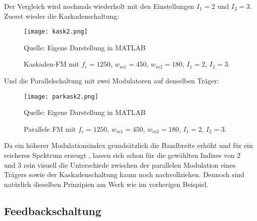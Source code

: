Der Vergleich wird nochmals wiederholt mit den Einstellungen $I_1 = 2$ und $I_2 = 3$. Zuerst wieder die Kaskadenschaltung:
\FloatBarrier
\begin{figure} [ht]
\centering
  \texttt{[image: kask2.png]}
\caption{Kaskaden-FM mit $f_c = 1250$, $w_{m1} = 450$, $w_{m2} = 180$, $I_1 = 2$, $I_2 = 3$. }
Quelle: Eigene Darstellung in MATLAB
\end{figure}
\FloatBarrier
Und die Parallelschaltung mit zwei Modulatoren auf denselben Träger:
\FloatBarrier
\begin{figure} [ht]
\centering
  \texttt{[image: parkask2.png]}
\caption{Parallele FM mit $f_c = 1250$, $w_{m1} = 450$, $w_{m2} = 180$, $I_1 = 2$, $I_2 = 3$. }
Quelle: Eigene Darstellung in MATLAB
\end{figure}
\FloatBarrier
Da ein höherer Modulationsindex grundsätzlich die Bandbreite erhöht und für ein reicheres Spektrum erzeugt \cite{chowningPaper}, lassen sich schon für die gewählten Indizes von $2$ und $3$ rein visuell die Unterschiede zwischen der parallelen Modulation eines Trägers sowie der Kaskadenschaltung kaum noch nachvollziehen. Dennoch sind natürlich dieselben Prinzipien am Werk wie im vorherigen Beispiel.

\subsection{Feedbackschaltung}

